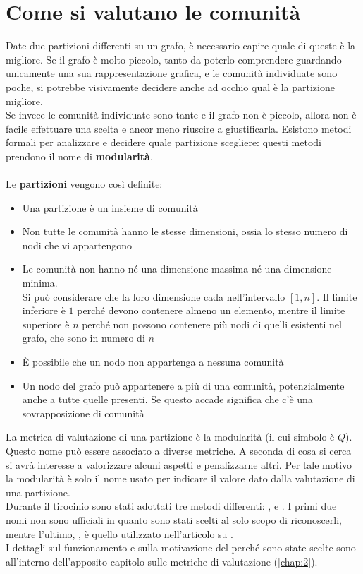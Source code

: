 \section{Come si valutano le comunità}
Date due partizioni differenti su un grafo, è necessario capire quale di queste è la migliore. Se il grafo è molto piccolo, tanto da poterlo comprendere guardando unicamente una sua rappresentazione grafica, e le comunità individuate sono poche, si potrebbe visivamente decidere anche ad occhio qual è la partizione migliore.\\
Se invece le comunità individuate sono tante e il grafo non è piccolo, allora non è facile effettuare una scelta e ancor meno riuscire a giustificarla. Esistono metodi formali per analizzare e decidere quale partizione scegliere: questi metodi prendono il nome di \textbf{modularità}.\\
\\
Le \textbf{partizioni} vengono così definite:
\begin{itemize}
	\item Una partizione è un insieme di comunità
	\item Non tutte le comunità hanno le stesse dimensioni, ossia lo stesso numero di nodi che vi appartengono
	\item Le comunità non hanno né una dimensione massima né una dimensione minima.\\
	Si può considerare che la loro dimensione cada nell'intervallo $[1, n]$. Il limite inferiore è $1$ perché devono contenere almeno un elemento, mentre il limite superiore è $n$ perché non possono contenere più nodi di quelli esistenti nel grafo, che sono in numero di $n$
	\item È possibile che un nodo non appartenga a nessuna comunità
	\item Un nodo del grafo può appartenere a più di una comunità, potenzialmente anche a tutte quelle presenti. Se questo accade significa che c'è una sovrapposizione di comunità
\end{itemize}
La metrica di valutazione di una partizione è la modularità (il cui simbolo è $Q$). Questo nome può essere associato a diverse metriche. A seconda di cosa si cerca si avrà interesse a valorizzare alcuni aspetti e penalizzarne altri. Per tale motivo la modularità è solo il nome usato per indicare il valore dato dalla valutazione di una partizione.\\
Durante il tirocinio sono stati adottati tre metodi differenti: \textbf{\mmax}, \textbf{\mover} e \textbf{\mmod}. I primi due nomi non sono ufficiali in quanto sono stati scelti al solo scopo di riconoscerli, mentre l'ultimo, \mmod, è quello utilizzato nell'articolo su \cnrl \cite{CNRL_paper}.\\
I dettagli sul funzionamento e sulla motivazione del perché sono state scelte sono all'interno dell'apposito capitolo sulle metriche di valutazione (\autoref{chap:2}).
%
